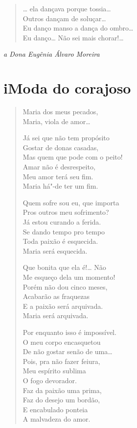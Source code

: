 {\begin{verse}
\ldots{} ela dançava porque tossia\ldots{}\\
\qquad Outros dançam de soluçar\ldots{}\\
\qquad\quad Eu danço manso a dança do ombro\ldots{}\\
\qquad\qquad\quad Eu danço\ldots{} Não sei mais chorar!\ldots{}
\end{verse}


\begin{flushright}
\emph{a Dona Eugênia Álvaro Moreira}
\end{flushright}

\section*{i\break Moda do corajoso}



\begin{verse}
Maria dos meus pecados,\\
Maria, viola de amor\ldots{}

Já sei que não tem propósito\\
Gostar de donas casadas,\\
Mas quem que pode com o peito!\\
Amar não é desrespeito,\\
Meu amor terá seu fim.\\
Maria há"-de ter um fim.

Quem sofre sou eu, que importa\\
Pros outros meu sofrimento?\\
Já estou curando a ferida.\\
Se dando tempo pro tempo\\
Toda paixão é esquecida.\\
Maria será esquecida.

Que bonita que ela é!\ldots{} Não\\
Me esqueço dela um momento!\\
Porém não dou cinco meses,\\
Acabarão as fraquezas\\
E a paixão será arquivada.\\
Maria será arquivada.

Por enquanto isso é impossível.\\
O meu corpo encasquetou\\
De não gostar senão de uma\ldots{}\\
Pois, pra não fazer feiura,\\
Meu espírito sublima\\
O fogo devorador.\\
Faz da paixão uma prima,\\
Faz do desejo um bordão,\\
E encabulado ponteia\\
A malvadeza do amor.


\end{verse}}
